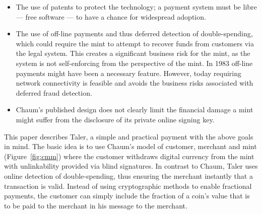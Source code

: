 \documentclass{llncs}
\begin{document}
\begin{itemize}
 \item The use of patents to protect the technology; a payment system
   must be libre --- free software --- to have a chance for widespread
   adoption.
 \item The use of off-line payments and thus deferred detection of
   double-spending, which could require the mint to attempt to recover
   funds from customers via the legal system.  This creates a
   significant business risk for the mint, as the system is not
   self-enforcing from the perspective of the mint.  In 1983 off-line
   payments might have been a necessary feature.  However, today
   requiring network connectivity is feasible and avoids the business
   risks associated with deferred fraud detection.
 \item %
   Chaum's published design does not clearly
   limit the financial damage a mint might suffer from the
   disclosure of its private online signing key.
\end{itemize}

This paper describes Taler, a simple and practical payment with the
above goals in mind.  The basic idea is to use Chaum's model of
customer, merchant and mint (Figure~\ref{fig:cmm}) where the customer
withdraws digital currency from the mint with unlinkability provided
via blind signatures.  In contrast to Chaum, Taler uses online
detection of double-spending, thus ensuring the merchant instantly
that a transaction is valid.  Instead of using cryptographic methods
to enable fractional payments, the customer can simply include
the fraction of a coin's value that is to be paid to the merchant in
his message to the merchant.
\end{document}
